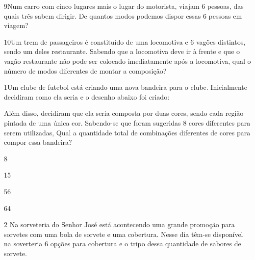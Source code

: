 {


\num{9}Num carro com cinco lugares mais o lugar do motorista, viajam 6
pessoas, das quais três sabem dirigir. De quantos modos podemos dispor
essas 6 pessoas em viagem?



\num{10}Um trem de passageiros é constituído de uma locomotiva e 6 vagões
distintos, sendo um deles restaurante. Sabendo que a locomotiva deve ir
à frente e que o vagão restaurante não pode ser colocado imediatamente
após a locomotiva, qual o número de modos diferentes de montar a
composição?




\num{1}Um clube de futebol está criando uma nova bandeira para o clube.
Inicialmente decidiram como ela seria e o desenho abaixo foi criado:


Além disso, decidiram que ela seria composta por duas cores, sendo cada
região pintada de uma única cor. Sabendo-se que foram sugeridas 8 cores
diferentes para serem utilizadas, Qual a quantidade total de combinações
diferentes de cores para compor essa bandeira?

\begin{escolha}
\item
  8
\item
  15
\item
  56
\item
  64
\end{escolha}



\num{2} Na sorveteria do Senhor José está acontecendo uma grande promoção
para sorvetes com uma bola de sorvete e uma cobertura. Nesse dia têm-se
disponível na soverteria 6 opções para cobertura e o tripo dessa
quantidade de sabores de sorvete.

}
